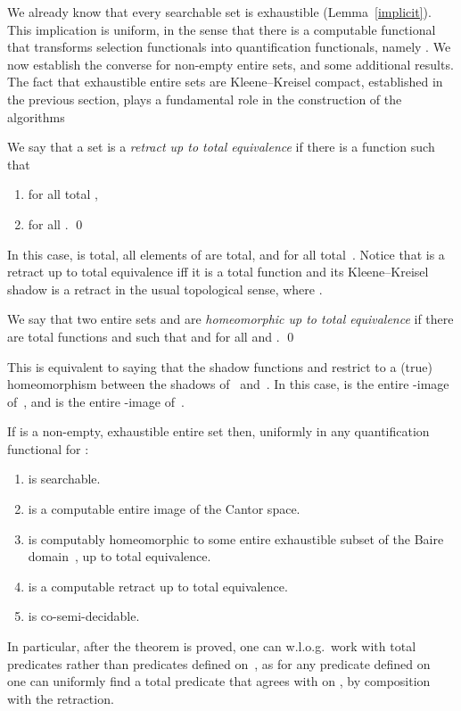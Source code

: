 \documentclass{LMCS}
\begin{document}
We already know that every searchable set is exhaustible
(Lemma~\ref{implicit}).  This implication is uniform, in the sense
that there is a computable functional  that transforms selection functionals
into quantification functionals, namely . We now establish the converse for non-empty
entire sets, and some additional results. The fact that exhaustible
entire sets are Kleene--Kreisel compact, established in the previous
section, plays a fundamental role in the construction of the
algorithms
\begin{defi} \label{total:retract} We say that a set  is a \emph{retract up to total
    equivalence} if there is a function  such that
\begin{enumerate}
\item  for all total ,
\item  for all . \qed
\end{enumerate}
\end{defi}
In this case,  is total, all elements of  are total, and
 for all total~. Notice that  is
a retract up to total equivalence iff it is a total function and its
Kleene--Kreisel shadow  is a retract in the
usual topological sense, where .
\begin{defi}
  We say that two entire sets  and  are \emph{homeomorphic up to total
    equivalence} if there are total functions  and  such that  and  for
  all  and . \qed
\end{defi}
This is equivalent to saying that the shadow functions  and
 restrict to a (true) homeomorphism between the shadows
of~ and~. In this case,  is the entire -image of~, and
 is the entire -image of~.

\begin{thm} \label{ex:main} If  is a
  non-empty, exhaustible entire set then, uniformly in any
  quantification functional for :
  \begin{enumerate}
  \item  is searchable.
  \item  is a computable entire image of the Cantor space.
  \item  is computably homeomorphic to some entire exhaustible
    subset of the Baire domain~, up to total equivalence.
  \item  is a computable retract up to total equivalence.
  \item   is co-semi-decidable.
  \end{enumerate}  
\end{thm}
In particular, after the theorem is proved, one can w.l.o.g.\ work
with total predicates rather than predicates defined on~, as for any
predicate  defined on~ one can
uniformly find a total predicate that agrees with  on , by
composition with the retraction.
\end{document}
